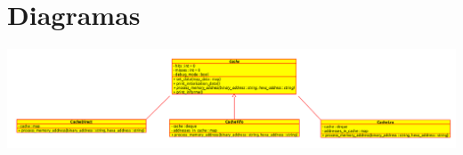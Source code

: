 \documentclass[a4paper,12pt]{report}
\begin{document}
\section{Diagramas}

\includegraphics[width=15cm]{diagramaClasesCache.png}
\end{document}
